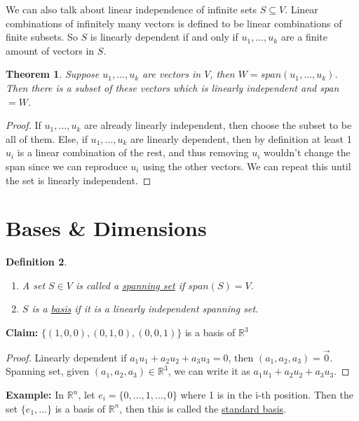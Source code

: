 \documentclass{article}
\newtheorem{theorem}{Theorem}[section]
\newtheorem{definition}[theorem]{Definition}
\newtheorem{one minute paper}[theorem]{One Minute Paper}
\begin{document}
We can also talk about linear independence of infinite sets $S \subseteq V$. Linear combinations of 
infinitely many vectors is defined to be linear combinations of finite subsets. So $S$ is linearly dependent if and only if $u_1, \dots, u_k$ are a finite amount of vectors in $S$. 

\begin{theorem}
    Suppose $u_1, \dots, u_k$ are vectors in $V$, then $W = span(u_1, \dots, u_k)$. Then there is a subset of these vectors
    which is linearly independent and span $= W$. 
\end{theorem}

\begin{proof}
    If $u_1, \dots, u_k$ are already linearly independent, then choose the subset to be all of them. Else, if $u_1, \dots, u_k$ are linearly dependent, then by definition at least 
    1 $u_i$ is a linear combination of the rest, and thus removing $u_i$ wouldn't change the span since we can reproduce $u_i$ using the other vectors. We can repeat this until the set is linearly independent. 
\end{proof}

\section*{Bases \& Dimensions}

\begin{definition}
    \begin{enumerate}
        \item A set $S \in V$ is called a \underline{spanning set} if $span(S) = V$. 
        \item $S$ is a \underline{basis} if it is a linearly independent spanning set.
    \end{enumerate}
\end{definition}

\textbf{Claim:} $\{(1,0,0), (0,1,0), (0,0,1)\}$ is a basis of $\mathbb{R}^3$

\begin{proof}
    Linearly dependent if $a_1u_1 + a_2u_2 + a_3u_3 = 0$, then $(a_1,a_2,a_3) = \vec{0}$. \\
    Spanning set, given $(a_1,a_2,a_3) \in \mathbb{R}^3$, we can write it as $a_1u_1 + a_2u_2 + a_3u_3$. 
\end{proof}

\textbf{Example:} In $\mathbb{R}^n$, let $e_i = \{0,\dots, 1, \dots, 0\}$ where 1 is in the i-th position. Then the set $\{e_1,\dots\}$ is a basis of $\mathbb{R}^n$, then this is called the \underline{standard basis}. \\
\end{document}
